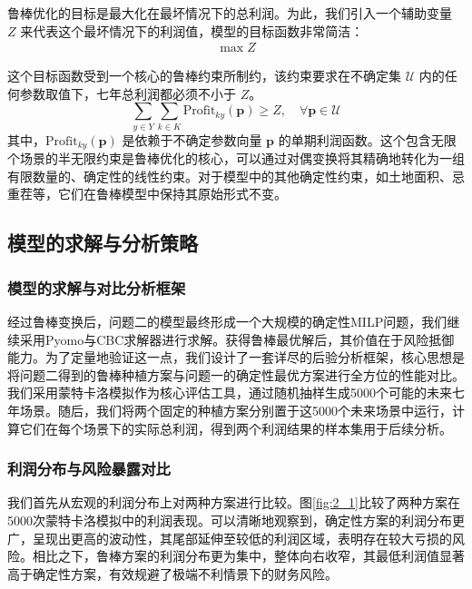 \documentclass[withoutpreface,bwprint]{cumcmthesis} %
\begin{document}
鲁棒优化的目标是最大化在最坏情况下的总利润。为此，我们引入一个辅助变量 $Z$ 来代表这个最坏情况下的利润值，模型的目标函数非常简洁：
\begin{align}
	\max Z
\end{align}

这个目标函数受到一个核心的鲁棒约束所制约，该约束要求在不确定集 $\mathcal{U}$ 内的任何参数取值下，七年总利润都必须不小于 $Z$。
\begin{equation}
	\sum_{y \in Y} \sum_{k \in K} \text{Profit}_{ky}(\mathbf{p}) \ge Z, \quad \forall \mathbf{p} \in \mathcal{U}
\end{equation}
其中，$\text{Profit}_{ky}(\mathbf{p})$ 是依赖于不确定参数向量 $\mathbf{p}$ 的单期利润函数。这个包含无限个场景的半无限约束是鲁棒优化的核心，可以通过对偶变换将其精确地转化为一组有限数量的、确定性的线性约束。对于模型中的其他确定性约束，如土地面积、忌重茬等，它们在鲁棒模型中保持其原始形式不变。

\subsection{模型的求解与分析策略}

\subsubsection{模型的求解与对比分析框架}

经过鲁棒变换后，问题二的模型最终形成一个大规模的确定性MILP问题，我们继续采用Pyomo与CBC求解器进行求解。获得鲁棒最优解后，其价值在于风险抵御能力。为了定量地验证这一点，我们设计了一套详尽的后验分析框架，核心思想是将问题二得到的鲁棒种植方案与问题一的确定性最优方案进行全方位的性能对比。我们采用蒙特卡洛模拟作为核心评估工具，通过随机抽样生成5000个可能的未来七年场景。随后，我们将两个固定的种植方案分别置于这5000个未来场景中运行，计算它们在每个场景下的实际总利润，得到两个利润结果的样本集用于后续分析。

\subsubsection{利润分布与风险暴露对比}

我们首先从宏观的利润分布上对两种方案进行比较。图\ref{fig:2_1}比较了两种方案在5000次蒙特卡洛模拟中的利润表现。可以清晰地观察到，确定性方案的利润分布更广，呈现出更高的波动性，其尾部延伸至较低的利润区域，表明存在较大亏损的风险。相比之下，鲁棒方案的利润分布更为集中，整体向右收窄，其最低利润值显著高于确定性方案，有效规避了极端不利情景下的财务风险。
\end{document}
